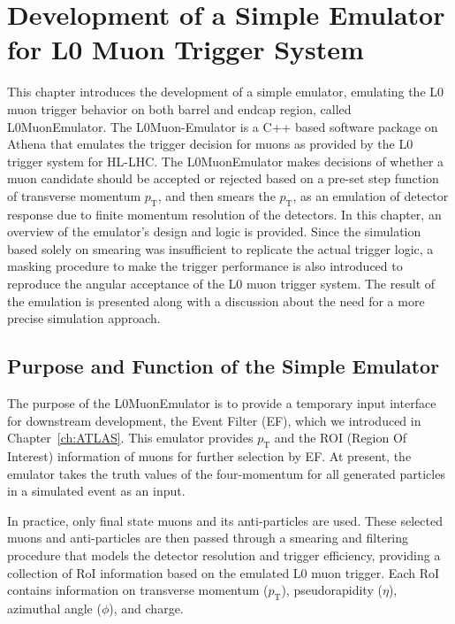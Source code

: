 \chapter{Development of a Simple Emulator for L0 Muon Trigger System} \label{ch:L0MuonEmulator}
This chapter introduces the development of a simple emulator, emulating the L0 muon trigger behavior on both barrel and endcap region, called L0MuonEmulator. The L0Muon-Emulator is a C++ based software package on Athena that emulates the trigger decision for muons as provided by the L0 trigger system for HL-LHC. The L0MuonEmulator makes decisions of whether a muon candidate should be accepted or rejected based on a pre-set step function of transverse momentum $p_\mathrm{T}$, and then smears the $p_\mathrm{T}$, as an emulation of detector response due to finite momentum resolution of the detectors. In this chapter, an overview of the emulator's design and logic is provided. Since the simulation based solely on smearing was insufficient to replicate the actual trigger logic, a masking procedure to make the trigger performance is also introduced to reproduce the angular acceptance of the L0 muon trigger system. The result of the emulation is presented along with a discussion about the need for a more precise simulation approach.
\section{Purpose and Function of the Simple Emulator} \label{sec:L0MuonPurpose}
The purpose of the L0MuonEmulator is to provide a temporary input interface for downstream development, the Event Filter (EF), which we introduced in Chapter~\ref{ch:ATLAS}. This emulator provides $p_\mathrm{T}$ and the ROI (Region Of Interest) information of muons for further selection by EF. At present, the emulator takes the truth values of the four-momentum for all generated particles in a simulated event as an input. 

In practice, only final state muons and its anti-particles are used. These selected muons and anti-particles are then passed through a smearing and filtering procedure that models the detector resolution and trigger efficiency, providing a collection of RoI information based on the emulated L0 muon trigger. Each RoI contains information on transverse momentum ($p_\mathrm{T}$), pseudorapidity ($\eta$), azimuthal angle ($\phi$), and charge.

